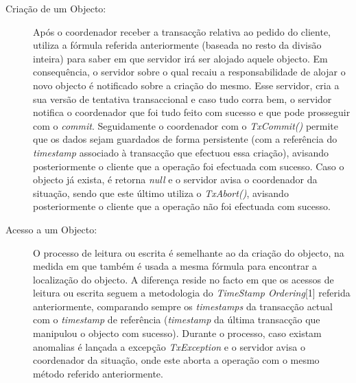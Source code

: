 \begin{description}
\item[Criação de um Objecto:] Após o coordenador receber a transacção relativa ao pedido do cliente, utiliza a fórmula referida anteriormente (baseada no resto da divisão inteira) para saber em que servidor irá ser alojado aquele objecto. Em consequência, o servidor sobre o qual recaiu a responsabilidade de alojar o novo objecto é notificado sobre a criação do mesmo. Esse servidor, cria a sua versão de tentativa transaccional e caso tudo corra bem, o servidor notifica o coordenador que foi tudo feito com sucesso e que pode prosseguir com o \textit{commit}. Seguidamente o coordenador com o \textit{TxCommit()} permite que os dados sejam guardados de forma persistente (com a referência do \textit{timestamp} associado à transacção que efectuou essa criação), avisando posteriormente o cliente que a operação foi efectuada com sucesso. Caso o objecto já exista, é retorna \textit{null} e o servidor avisa o coordenador da situação, sendo que este último utiliza o \textit{TxAbort()}, avisando posteriormente o cliente que a operação não foi efectuada com sucesso.

\item[Acesso a um Objecto:] O processo de leitura ou escrita é semelhante ao da criação do objecto, na medida em que também é usada a mesma fórmula para encontrar a localização do objecto. A diferença reside no facto em que os acessos de leitura ou escrita seguem a metodologia do \textit{TimeStamp Ordering}[1] referida anteriormente, comparando sempre os \textit{timestamps} da transacção actual com o \textit{timestamp} de referência (\textit{timestamp} da última transacção que manipulou o objecto com sucesso). Durante o processo, caso existam anomalias é lançada a excepção \textit{TxException} e o servidor avisa o coordenador da situação, onde este aborta a operação com o mesmo método referido anteriormente.
\end{description}